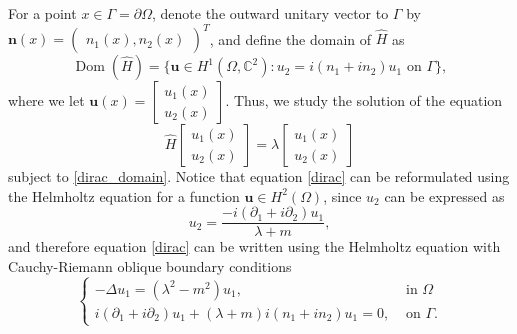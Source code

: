 \documentclass[5p,authoryear]{elsarticle}
\DeclareMathOperator{\dom}{Dom}
\begin{document}
For a point \(x \in \Gamma = \partial \Omega\), denote the outward unitary vector to \(\Gamma\) by \(\mathbf{n}(x) = \begin{pmatrix}
    n_1(x), n_2(x)
\end{pmatrix}^T\),
and define the domain of \(\hat{H}\) as
\begin{equation}\label{dirac_domain}
\dom(\hat{H}) = \{\mathbf{u} \in H^1(\Omega, \mathbb{C}^2): u_2 = i(n_1+i n_2)u_1 \text{ on } \Gamma\},
\end{equation}
where we let \(\mathbf{u}(x)=\begin{bmatrix}
    u_1(x)\\
    u_2(x)
    \end{bmatrix}\).
Thus, we study the solution of the equation
\begin{equation}\label{dirac}
    \hat{H}
    \begin{bmatrix}
        u_1(x)\\
        u_2(x)
    \end{bmatrix}
    =\lambda
    \begin{bmatrix}
    u_1(x)\\
    u_2(x)
    \end{bmatrix}
\end{equation}
subject to \eqref{dirac_domain}. Notice that equation \eqref{dirac} can be reformulated using the Helmholtz equation for a function \(\mathbf{u} \in H^2(\Omega)\), since \(u_2\) can be expressed as
\[
    u_2 = \frac{-i (\partial_1 + i\partial_2)u_1}{\lambda + m},
\]
and therefore equation \eqref{dirac} can be written using the Helmholtz equation with Cauchy-Riemann oblique boundary conditions
\begin{equation}\label{helm_system}
    \begin{cases}
        -\Delta u_1 = (\lambda^2 - m^2)u_1, & \text{ in } \Omega\\
         i (\partial_1 + i\partial_2)u_1 + (\lambda + m)i(n_1 + i n_2)u_1 = 0, & \text{ on } \Gamma.
    \end{cases}
\end{equation}

\end{document}
